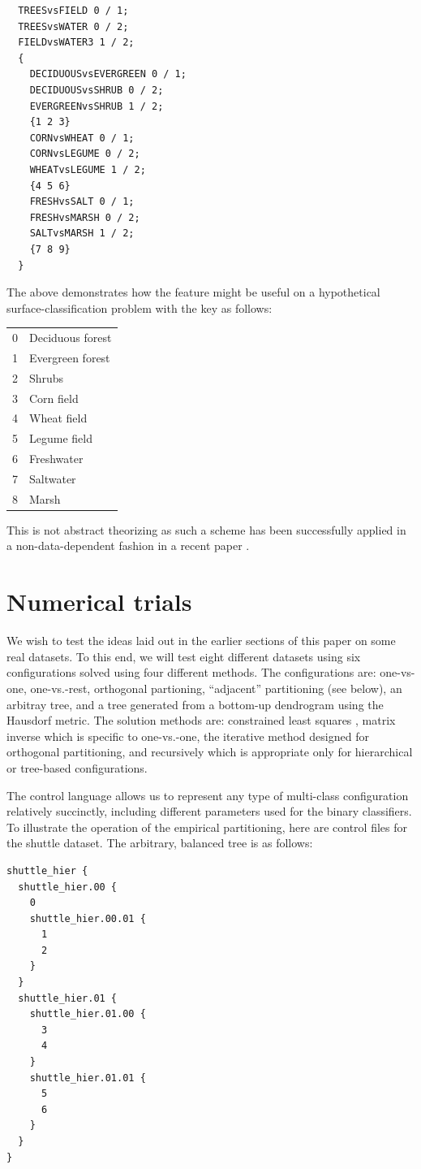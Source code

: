 \begin{verbatim}
  TREESvsFIELD 0 / 1;
  TREESvsWATER 0 / 2;
  FIELDvsWATER3 1 / 2;
  {
    DECIDUOUSvsEVERGREEN 0 / 1;
    DECIDUOUSvsSHRUB 0 / 2;
    EVERGREENvsSHRUB 1 / 2;
    {1 2 3}
    CORNvsWHEAT 0 / 1;
    CORNvsLEGUME 0 / 2;
    WHEATvsLEGUME 1 / 2;
    {4 5 6}
    FRESHvsSALT 0 / 1;
    FRESHvsMARSH 0 / 2;
    SALTvsMARSH 1 / 2;
    {7 8 9}
  }
\end{verbatim}

The above demonstrates how the feature might be useful
on a hypothetical surface-classification problem with the key as follows:

\begin{tabular}{ll}
	0 & Deciduous forest \\
	1 & Evergreen forest \\
	2 & Shrubs \\
	3 & Corn field \\
	4 & Wheat field \\
	5 & Legume field \\
	6 & Freshwater \\
	7 & Saltwater \\
	8 & Marsh
\end{tabular}

This is not abstract theorizing as
such a scheme has been successfully applied in a non-data-dependent fashion
in a recent paper \citep{Zhou_etal2019}.

\section{Numerical trials}

We wish to test the ideas laid out in the earlier sections of this paper 
on some real datasets.
To this end, we will test eight different datasets using six configurations 
solved using four different methods.
The configurations are: one-vs-one, one-vs.-rest, orthogonal partioning,
``adjacent'' partitioning (see below), an arbitray tree, and a tree generated
from a bottom-up dendrogram using the Hausdorf metric.
The solution methods are: constrained least squares \citep{Lawson_Hanson1995},
matrix inverse which is specific to one-vs.-one,
the iterative method designed for orthogonal partitioning,
and recursively which is appropriate
only for hierarchical or tree-based configurations.

The control language allows us to represent any type of multi-class 
configuration relatively succinctly, including different parameters
used for the binary classifiers.
To illustrate the operation of the empirical partitioning, here are
control files for the shuttle dataset.
The arbitrary, balanced tree is as follows:
\begin{verbatim}
shuttle_hier {
  shuttle_hier.00 {
    0
    shuttle_hier.00.01 {
      1
      2
    }
  }
  shuttle_hier.01 {
    shuttle_hier.01.00 {
      3
      4
    }
    shuttle_hier.01.01 {
      5
      6
    }
  }
}

\end{verbatim}

